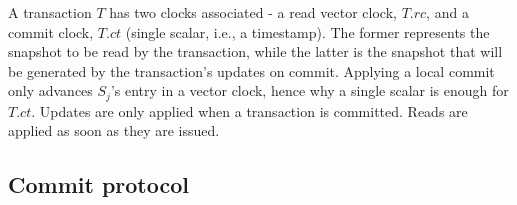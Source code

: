 \documentclass[sigconf, nonacm]{acmart}
\begin{document}
A transaction $T$ has two clocks associated - a read vector clock, $T\!.\mathit{rc}$, and a commit clock, $T\!.\mathit{ct}$ (single scalar, i.e., a timestamp).
The former represents the snapshot to be read by the transaction, while the latter is the snapshot that will be generated by the transaction's updates on commit.
Applying a local commit only advances $S_j$'s entry in a vector clock, hence why a single scalar is enough for $T\!.\mathit{ct}$.
Updates are only applied when a transaction is committed. 
Reads are applied as soon as they are issued. %

\subsection{Commit protocol}
\label{subsec:commit}

\end{document}
